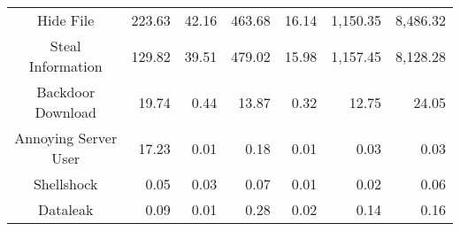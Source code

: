\begin{table*}[]
{\begin{tabular}{crrrrrr}
Hide File                                               & 223.63                                                                                   & 42.16                                                                                & 463.68                                              & 16.14                                                     & 1,150.35                                            & 8,486.32                                                  \\ 
Steal Information                                       & 129.82                                                                                   & 39.51                                                                                & 479.02                                              & 15.98                                                     & 1,157.45                                            & 8,128.28                                                  \\ 

Backdoor Download                                       & 19.74                                                                                    & 0.44                                                                                 & 13.87                                               & 0.32                                                      & 12.75                                               & 24.05                                                     \\ 
Annoying Server User                                    & 17.23                                                                                    & 0.01                                                                                 & 0.18                                                & 0.01                                                      & 0.03                                                & 0.03                                                      \\ 

Shellshock                                              & 0.05                                                                                     & 0.03                                                                                 & 0.07                                                & 0.01                                                      & 0.02                                                & 0.06                                                      \\ 
Dataleak                                                & 0.09                                                                                     & 0.01                                                                                 & 0.28                                                & 0.02                                                      & 0.14                                                & 0.16                                                      \\ 


\end{tabular}}
\end{table*}
